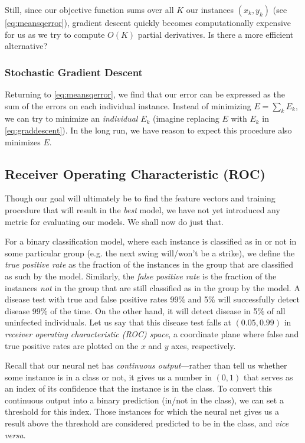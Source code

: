 \documentclass[10pt]{article}
\begin{document}
Still, since our objective function sums over all $K$ our instances $(x_k, y_k)$ (see \cref{eq:meansqerror}), gradient descent quickly becomes computationally expensive for us as we try to compute $O(K)$ partial derivatives.
Is there a more efficient alternative?

\subsubsection{Stochastic Gradient Descent}

Returning to \cref{eq:meansqerror}, we find that our error can be expressed as the sum of the errors on each individual instance.
Instead of minimizing $E = \sum_k E_k$, we can try to minimize an \emph{individual} $E_k$ (imagine replacing $E$ with $E_k$ in \cref{eq:graddescent}).
In the long run, we have reason to expect this procedure also minimizes $E$.


\subsection{Receiver Operating Characteristic (ROC)}

Though our goal will ultimately be to find the feature vectors and training procedure that will result in the \emph{best} model, we have not yet introduced any metric for evaluating our models.
We shall now do just that.

For a binary classification model, where each instance is classified as in or not in some particular group (e.g. the next swing will/won't be a strike), we define the \emph{true positive rate} as the fraction of the instances in the group that are classified as such by the model.
Similarly, the \emph{false positive rate} is the fraction of the instances \emph{not} in the group that are still classified as in the group by the model.
A disease test with true and false positive rates 99\% and 5\% will successfully detect disease 99\% of the time.
On the other hand, it will detect disease in 5\% of all uninfected individuals.
Let us say that this disease test falls at $(0.05, 0.99)$ in \emph{receiver operating characteristic (ROC) space}, a coordinate plane where false and true positive rates are plotted on the $x$ and $y$ axes, respectively.

Recall that our neural net has \emph{continuous output}---rather than tell us whether some instance is in a class or not, it gives us a number in $(0, 1)$ that serves as an index of its confidence that the instance is in the class.
To convert this continuous output into a binary prediction (in/not in the class), we can set a threshold for this index.
Those instances for which the neural net gives us a result above the threshold are considered predicted to be in the class, and \emph{vice versa}.
\end{document}
